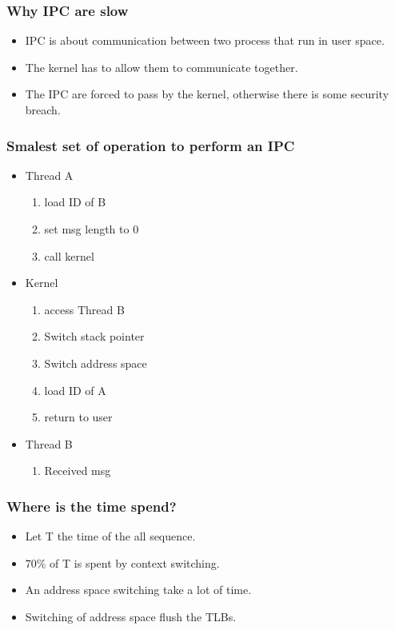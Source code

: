 \begin{frame}
\frametitle{Why IPC are slow}
\begin{itemize}
\item IPC is about communication between two process that run in user
space.
\item The kernel has to allow them to communicate together.
\item The IPC are forced to pass by the kernel, otherwise there is some
security breach.
\end{itemize}
\end{frame}

\begin{frame}
\frametitle{Smalest set of operation to perform an IPC}
\begin{itemize}
\item Thread A
\begin{enumerate}
\item load ID of B
\item set msg length to 0
\item call kernel
\end{enumerate}
\item Kernel
\begin{enumerate}
\item access Thread B
\item Switch stack pointer
\item Switch address space
\item load ID of A
\item return to user
\end{enumerate}
\item Thread B
\begin{enumerate}
\item Received msg
\end{enumerate}
\end{itemize}
\end{frame}

\begin{frame}
\frametitle{Where is the time spend?}
\begin{itemize}
\item Let T the time of the all sequence.
\item 70\% of T is spent by context switching.
\item An address space switching take a lot of time.
\item Switching of address space flush the TLBs.
\end{itemize}
\end{frame}


